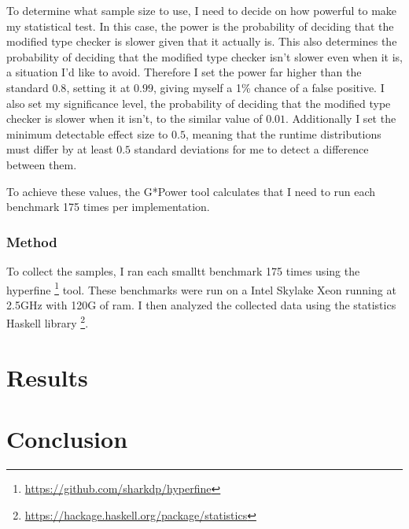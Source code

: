 \documentclass{article}
\begin{document}
To determine what sample size to use, I need to decide on how powerful to make my statistical test.
In this case, the power is the probability of deciding that the modified type checker is slower given that it actually is.
This also determines the probability of deciding that the modified type checker isn't slower even when it is, a situation I'd like to avoid.
Therefore I set the power far higher than the standard $0.8$, setting it at $0.99$, giving myself a 1\% chance of a false positive.
I also set my significance level, the probability of deciding that the modified type checker is slower when it isn't, to the similar value of $0.01$.
Additionally I set the minimum detectable effect size to $0.5$, meaning that the runtime distributions must differ by at least $0.5$ standard deviations for me to detect a difference between them.

To achieve these values, the G*Power tool \citep{Faul2009} calculates that I need to run each benchmark 175 times per implementation.

\subsubsection{Method}
To collect the samples, I ran each smalltt benchmark 175 times using the hyperfine \footnote{\url{https://github.com/sharkdp/hyperfine}} tool.
These benchmarks were run on a Intel Skylake Xeon running at 2.5GHz with 120G of ram.
I then analyzed the collected data using the statistics Haskell library \footnote{\url{https://hackage.haskell.org/package/statistics}}.


\section{Results}

\section{Conclusion}

\newpage

\printbibliography

\todos
\end{document}
